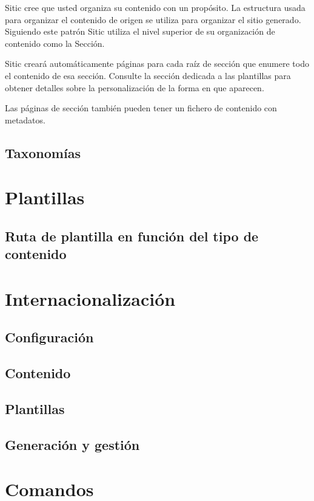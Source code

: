 Sitic cree que usted organiza su contenido con un propósito. La estructura usada
para organizar el contenido de origen se utiliza para organizar el sitio generado. Siguiendo
este patrón Sitic utiliza el nivel superior de su organización de contenido como la Sección.

Sitic creará automáticamente páginas para cada raíz de sección que enumere todo el contenido
de esa sección. Consulte la sección dedicada a las plantillas para obtener detalles sobre 
la personalización de la forma en que aparecen.

Las páginas de sección también pueden tener un fichero de contenido con metadatos.

\subsection{Taxonomías}


\section{Plantillas}

\subsection{Ruta de plantilla en función del tipo de contenido}


\section{Internacionalización}

\subsection{Configuración}
\subsection{Contenido}
\subsection{Plantillas}
\subsection{Generación y gestión}


\section{Comandos}


